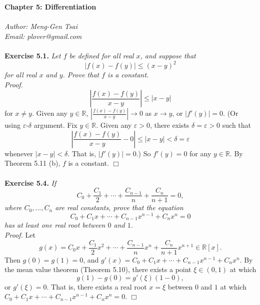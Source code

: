 \documentclass{article}
\begin{document}
\textbf{\Large Chapter 5: Differentiation} \\\\



\emph{Author: Meng-Gen Tsai} \\
\emph{Email: plover@gmail.com} \\\\






\textbf{Exercise 5.1.}
\emph{Let $f$ be defined for all real $x$, and suppose that
$$|f(x) - f(y)| \leq (x - y)^2$$
for all real $x$ and $y$. Prove that $f$ is a constant.} \\

\emph{Proof.}
$$\left| \frac{f(x) - f(y)}{x - y} \right| \leq |x - y|$$
for $x \neq y$.
Given any $y \in \mathbb{R}$,
$|\frac{f(x) - f(y)}{x - y}| \rightarrow 0$ as $x \rightarrow y$,
or $|f'(y)| = 0$.
(Or using $\varepsilon$-$\delta$ argument. Fix $y \in \mathbb{R}$.
Given any $\varepsilon > 0$, there exists $\delta = \varepsilon > 0$ such that
$$\left| \frac{f(x) - f(y)}{x - y} - 0 \right| \leq |x - y| < \delta = \varepsilon$$
whenever $|x - y| < \delta$. That is, $|f'(y)| = 0$.)
So $f'(y) = 0$ for any $y \in \mathbb{R}$.
By Theorem 5.11 (b), $f$ is a constant.
$\Box$ \\\\






\textbf{Exercise 5.4.}
\emph{If
$$C_0 + \frac{C_1}{2} + \cdots + \frac{C_{n- 1}}{n} + \frac{C_n}{n + 1} = 0,$$
where $C_0, ..., C_n$ are real constants, prove that the equation
$$C_0 + C_1 x + \cdots + C_{n - 1} x^{n - 1} + C_n x^n = 0$$
has at least one real root between $0$ and $1$.} \\

\emph{Proof.}
Let
$$g(x) = C_0 x + \frac{C_1}{2} x^2 + \cdots + \frac{C_{n- 1}}{n} x^n + \frac{C_n}{n + 1} x^{n + 1}
\in \mathbb{R}[x].$$
Then $g(0) = g(1) = 0$, and
$g'(x) = C_0 + C_1 x + \cdots + C_{n - 1} x^{n - 1} + C_n x^n$.
By the mean value theorem (Theorem 5.10), there exists a point $\xi \in (0, 1)$ at which
$$g(1) - g(0) = g'(\xi)(1 - 0),$$
or $g'(\xi) = 0.$ That is, there exists a real root $x = \xi$ between $0$ and $1$
at which $C_0 + C_1 x + \cdots + C_{n - 1} x^{n - 1} + C_n x^n = 0$.
$\Box$ \\\\
\end{document}
